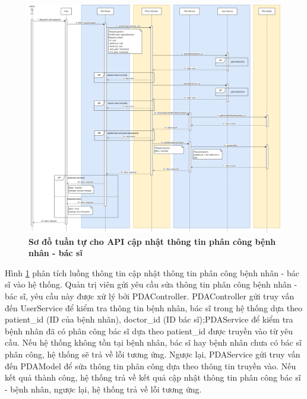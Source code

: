 \begin{figure}[H]
  \centering
  \includegraphics[scale=0.3]{Images/sequence_api/editAssignment.png}
  \caption[Sơ đồ tuần tự cho API cập nhật thông tin phân công bệnh nhân - bác sĩ]{\bfseries \fontsize{12pt}{0pt}
  \selectfont Sơ đồ tuần tự cho API cập nhật thông tin phân công bệnh nhân - bác sĩ }
  \label{api_editPDA} %
\end{figure}
Hình \ref{api_editPDA} phân tích luồng thông tin cập nhật thông tin phân công bệnh nhân - bác sĩ vào hệ thống. Quản trị viên gửi yêu cầu sửa thông tin phân công bệnh nhân - bác sĩ, 
yêu cầu này được xử lý bởi PDAController. PDAController gửi truy vấn đến UserService để kiểm tra thông tin bệnh nhân, bác sĩ trong hệ thống dựa theo patient\_id (ID của bệnh nhân), doctor\_id (ID bác sĩ);PDAService để kiểm
tra bệnh nhân đã có phân công bác sĩ dựa theo patient\_id được truyền vào từ yêu cầu. Nếu hệ thống không tồn tại bệnh nhân, bác sĩ hay bệnh nhân chưa có bác sĩ phân công, hệ thống sẽ trả về lỗi tương ứng. 
Ngược lại, PDAService gửi truy vấn đến PDAModel để sửa thông tin phân công dựa theo thông tin truyền vào. Nếu kết quả thành công, hệ thống trả về kết quả cập nhật thông tin phân công bác sĩ - bệnh nhân, ngược lại, hệ thống trả về lỗi tương ứng.

